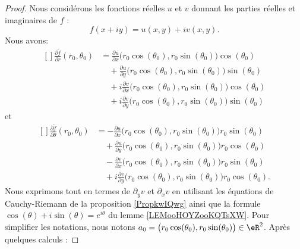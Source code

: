 \begin{proof}
	Nous considérons les fonctions réelles \( u\) et \( v\) donnant les parties réelles et imaginaires de \( f\) :
	\begin{equation}
		f(x+iy)=u(x,y)+iv(x,y).
	\end{equation}
	Nous avons:
	\begin{equation}
		\begin{aligned}[]
			\frac{ \partial \tilde f }{ \partial r }(r_0,\theta_0)
			 & =\frac{ \partial u }{ \partial x }\big( r_0\cos(\theta_0),r_0\sin(\theta_0) \big)\cos(\theta_0)        \\
			 & \quad+\frac{ \partial u }{ \partial y }\big( r_0\cos(\theta_0),r_0\sin(\theta_0) \big)\sin(\theta_0)   \\
			 & \quad+ i\frac{ \partial v }{ \partial x }\big( r_0\cos(\theta_0),r_0\sin(\theta_0) \big)\cos(\theta_0) \\
			 & \quad+ i\frac{ \partial v }{ \partial y }\big( r_0\cos(\theta_0),r_0\sin(\theta_0) \big)\sin(\theta_0)
		\end{aligned}
	\end{equation}
	et
	\begin{equation}
		\begin{aligned}[]
			\frac{ \partial \tilde f }{ \partial \theta }(r_0,\theta_0) & =
			-\frac{ \partial u }{ \partial x }\big( r_0\cos(\theta_0),r_0\sin(\theta_0) \big)r_0\sin(\theta_0)                                                                      \\
			                                                            & \quad+\frac{ \partial u }{ \partial y }\big( r_0\cos(\theta_0),r_0\sin(\theta_0) \big)r_0\cos(\theta_0)   \\
			                                                            & \quad-\frac{ \partial v }{ \partial x }\big( r_0\cos(\theta_0),r_0\sin(\theta_0) \big)r_0\sin(\theta_0)   \\
			                                                            & \quad+i\frac{ \partial v }{ \partial y }\big( r_0\cos(\theta_0),r_0\sin(\theta_0) \big)r_0\cos(\theta_0).
		\end{aligned}
	\end{equation}
	Nous exprimons tout en termes de \( \partial_yv\) et \( \partial_xv\) en utilisant les équations de Cauchy-Riemann de la proposition \ref{PropkwIQwg} ainsi que la formule \( \cos(\theta)+i\sin(\theta)= e^{i\theta}\) du lemme \ref{LEMooHOYZooKQTsXW}. Pour simplifier les notations, nous notons \( a_0=\big( r_0\cos(\theta_0), r_0\sin(\theta_0) \big)\in \eR^2 \). Après quelques calculs :

\end{proof}
